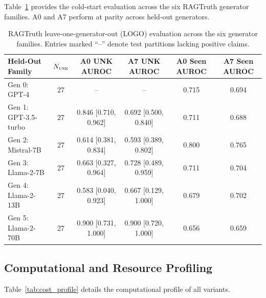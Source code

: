 \documentclass[pdflatex,sn-mathphys,Numbered]{sn-jnl}
\begin{document}
Table~\ref{tab:rag_logo} provides the cold-start evaluation across the six RAGTruth generator families. A0 and A7 perform at parity across held-out generators.

\begin{table}[htbp]
\caption{RAGTruth leave-one-generator-out (LOGO) evaluation across the six generator families. Entries marked ``--'' denote test partitions lacking positive claims.}\label{tab:rag_logo}
\scriptsize
\setlength{\tabcolsep}{2.2pt}
\begin{tabular}{@{}lccccc@{}}
\toprule
\textbf{Held-Out Family} & $N_{\textsc{unk}}$ & \textbf{A0 UNK AUROC} & \textbf{A7 UNK AUROC} & \textbf{A0 Seen AUROC} & \textbf{A7 Seen AUROC} \\
\midrule
Gen 0: GPT-4 & 27 & -- & -- & 0.715 & 0.694 \\
Gen 1: GPT-3.5-turbo & 27 & 0.846 [0.710, 0.962] & 0.692 [0.500, 0.840] & 0.711 & 0.688 \\
Gen 2: Mistral-7B & 27 & 0.614 [0.381, 0.834] & 0.593 [0.389, 0.802] & 0.800 & 0.765 \\
Gen 3: Llama-2-7B & 27 & 0.663 [0.327, 0.964] & 0.728 [0.489, 0.959] & 0.711 & 0.704 \\
Gen 4: Llama-2-13B & 27 & 0.583 [0.040, 0.923] & 0.667 [0.129, 1.000] & 0.679 & 0.702 \\
Gen 5: Llama-2-70B & 27 & 0.900 [0.731, 1.000] & 0.900 [0.720, 1.000] & 0.656 & 0.659 \\
\bottomrule
\end{tabular}
\end{table}

\subsection{Computational and Resource Profiling}\label{subsec:results_cost}

Table~\ref{tab:cost_profile} details the computational profile of all variants.
\end{document}
